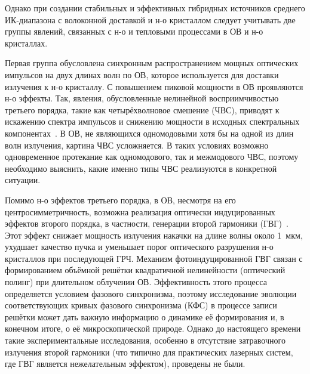 Однако при создании стабильных и эффективных гибридных источников среднего ИК-диапазона с волоконной доставкой и н-о кристаллом следует учитывать две группы явлений, связанных с н-о и тепловыми процессами в ОВ и н-о кристаллах.

Первая группа обусловлена синхронным распространением мощных оптических импульсов на двух длинах волн по ОВ, которое используется для доставки излучения к н-о кристаллу. С повышением пиковой мощности в ОВ проявляются н-о эффекты. Так, явления, обусловленные нелинейной восприимчивостью третьего порядка, такие как четырёхволновое смешение (ЧВС), приводят к искажению спектра импульсов и снижению мощности в исходных спектральных компонентах~\cite{agrawal2019}. В ОВ, не являющихся одномодовыми хотя бы на одной из длин волн излучения, картина ЧВС усложняется. В таких условиях возможно одновременное протекание как одномодового, так и межмодового ЧВС, поэтому необходимо выяснить, какие именно типы ЧВС реализуются в конкретной ситуации.

Помимо н-о эффектов третьего порядка, в ОВ, несмотря на его центросимметричность, возможна реализация оптически индуцированных эффектов второго порядка, в частности, генерации второй гармоники (ГВГ)~\cite{osterberg1986dye}. Этот эффект снижает мощность излучения накачки на длине волны около 1~мкм, ухудшает качество пучка и уменьшает порог оптического разрушения н-о кристаллов при последующей ГРЧ. Механизм фотоиндуцированной ГВГ связан с формированием объёмной решётки квадратичной нелинейности (оптический полинг) при длительном облучении ОВ. Эффективность этого процесса определяется условием фазового синхронизма, поэтому исследование эволюции соответствующих кривых фазового синхронизма (КФС) в процессе записи решётки может дать важную информацию о динамике её формирования и, в конечном итоге, о её микроскопической природе. Однако до настоящего времени такие экспериментальные исследования, особенно в отсутствие затравочного излучения второй гармоники (что типично для практических лазерных систем, где ГВГ является нежелательным эффектом), проведены не были.

